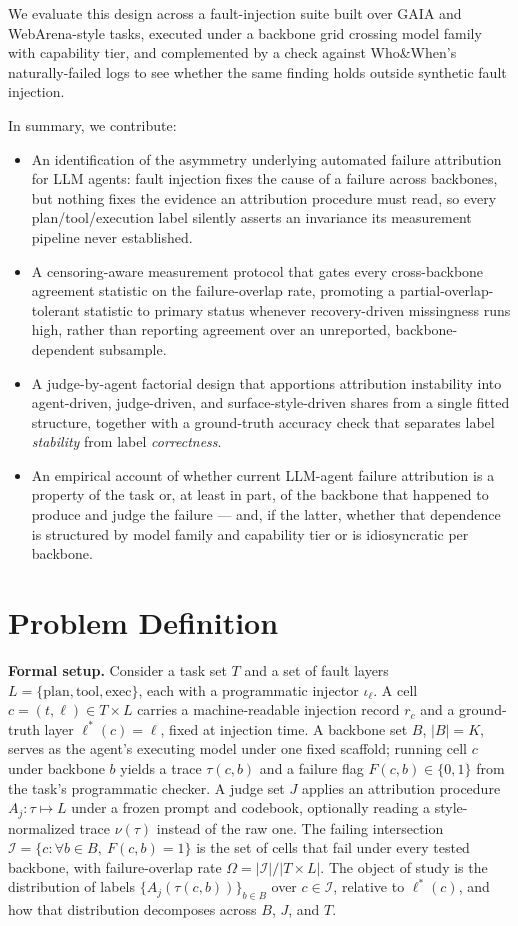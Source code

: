 \documentclass[11pt]{article}
\begin{document}
We evaluate this design across a fault-injection suite built over GAIA and WebArena-style tasks, executed under a backbone grid crossing model family with capability tier, and complemented by a check against Who\&When's \citep{WhoWhen2025} naturally-failed logs to see whether the same finding holds outside synthetic fault injection.

In summary, we contribute:
\begin{itemize}[leftmargin=1.4em]
\item An identification of the asymmetry underlying automated failure attribution for LLM agents: fault injection fixes the cause of a failure across backbones, but nothing fixes the evidence an attribution procedure must read, so every plan/tool/execution label silently asserts an invariance its measurement pipeline never established.
\item A censoring-aware measurement protocol that gates every cross-backbone agreement statistic on the failure-overlap rate, promoting a partial-overlap-tolerant statistic to primary status whenever recovery-driven missingness runs high, rather than reporting agreement over an unreported, backbone-dependent subsample.
\item A judge-by-agent factorial design that apportions attribution instability into agent-driven, judge-driven, and surface-style-driven shares from a single fitted structure, together with a ground-truth accuracy check that separates label \emph{stability} from label \emph{correctness}.
\item An empirical account of whether current LLM-agent failure attribution is a property of the task or, at least in part, of the backbone that happened to produce and judge the failure --- and, if the latter, whether that dependence is structured by model family and capability tier or is idiosyncratic per backbone.
\end{itemize}

\section{Problem Definition}

\noindent\textbf{Formal setup.} Consider a task set $T$ and a set of fault layers $L=\{\text{plan},\text{tool},\text{exec}\}$, each with a programmatic injector $\iota_\ell$. A cell $c=(t,\ell)\in T\times L$ carries a machine-readable injection record $r_c$ and a ground-truth layer $\ell^*(c)=\ell$, fixed at injection time. A backbone set $B$, $|B|=K$, serves as the agent's executing model under one fixed scaffold; running cell $c$ under backbone $b$ yields a trace $\tau(c,b)$ and a failure flag $F(c,b)\in\{0,1\}$ from the task's programmatic checker. A judge set $J$ applies an attribution procedure $A_j:\tau\mapsto L$ under a frozen prompt and codebook, optionally reading a style-normalized trace $\nu(\tau)$ instead of the raw one. The failing intersection $\mathcal{I}=\{c : \forall b\in B,\ F(c,b)=1\}$ is the set of cells that fail under every tested backbone, with failure-overlap rate $\Omega=|\mathcal{I}|/|T\times L|$. The object of study is the distribution of labels $\{A_j(\tau(c,b))\}_{b\in B}$ over $c\in\mathcal{I}$, relative to $\ell^*(c)$, and how that distribution decomposes across $B$, $J$, and $T$.
\end{document}
